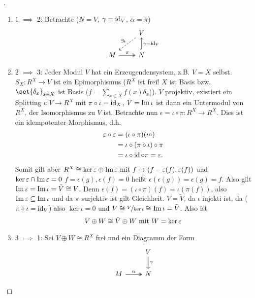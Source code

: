 \begin{proof}[]
	\begin{enumerate}
		\item 1 $\implies$ 2: Betrachte ($N = V$, $\gamma = \id_V$, $\alpha = \pi$)
		\[
			\begin{tikzcd}
			& V \arrow[ld, "\exists \iota"', dashed] \\
			M \arrow[r, "\pi", two heads] & N \arrow[u, "\gamma = \id_V"', hook]  
			\end{tikzcd}
		\]
		\item 2 $\implies$ 3: Jeder Modul $V$ hat ein Erzeugendensystem, z.B. $V = X$ selbst. $S_X\colon R^X \to V$ ist ein Epimorphismus ($R^X$ ist frei! $X$ ist Basis bzw. $\set{\delta_x}_{x \in X}$ ist Basis ($f = \sum_{x\in X} f(x)\delta_x$)). $V$ projektiv, existiert ein Splitting $\iota \colon V \to R^X$ mit $\pi \circ \iota = \id_X$, $\tilde{V} = \Image \iota$ ist dann ein Untermodul von $R^X$, der Isomorphismus zu $V$ ist. Betrachte nun $\epsilon = \iota \circ \pi \colon R^X \to R^X$. Dies ist ein idempotenter Morphismus, d.h. 
		\begin{align*}
			\epsilon \circ \epsilon &= (\iota \circ \pi)(\iota \circ)\\
			&= \iota \circ (\pi \circ \iota)\circ \pi\\
			&= \iota \circ \id \circ \pi = \epsilon.
		\end{align*}
		Somit gilt aber $R^X \cong \ker \epsilon \oplus \Image \epsilon \mit f \mapsto (f - \epsilon(f), \epsilon(f))$ und $\ker \epsilon \cap \Image \epsilon = 0$ %
		$f = \epsilon(g), \epsilon(f) = 0$ heißt $\epsilon(\epsilon(g)) = \epsilon(g) = f$. Also gilt $\Image \epsilon = \Image \iota = \tilde{V} \cong V$. Denn $\epsilon(f) = (\iota \circ \pi)(f) = \iota(\pi(f))$, also $\Image \epsilon \subseteq \Image \iota$ und da $\pi$ surjektiv ist gilt Gleichheit. $V = \tilde{V}$, da $\iota$ injekti ist, da ($\pi \circ \iota = \id_V$) also $\ker \iota = 0$ und $V \cong \lnkset{V}{\ker \iota} \cong \Image \iota = \tilde{V}$. Also ist
		\begin{align*}
			V \oplus W \cong \tilde{V} \oplus W \mit W = \ker \epsilon
		\end{align*}
		\item 3 $\implies$ 1: Sei $V \oplus W \cong R^X$ frei und ein Diagramm der Form
		\[
			\begin{tikzcd}[ampersand replacement=\&]
			\& V \arrow[d, "\gamma"] \\
			M \arrow[r, "\alpha", two heads] \& N                    

\end{tikzcd}\]
\end{enumerate}
\end{proof}
